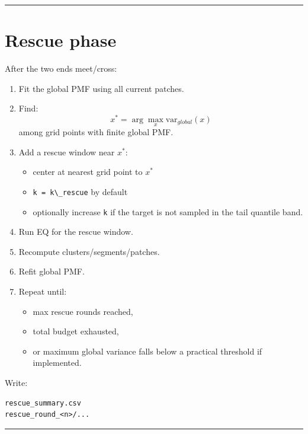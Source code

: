 \documentclass[
  10.5pt,
]{article}
\newcommand{\passthrough}[1]{#1}
\providecommand{\tightlist}{%
  \setlength{\itemsep}{0pt}\setlength{\parskip}{0pt}}
\begin{document}
\begin{center}\rule{0.5\linewidth}{0.5pt}\end{center}

\section{Rescue phase}\label{rescue-phase}

After the two ends meet/cross:

\begin{enumerate}
\def\labelenumi{\arabic{enumi}.}
\tightlist
\item
  Fit the global PMF using all current patches.
\item
  Find: \[
  x^* = \arg\max_x \mathrm{var}_{global}(x)
  \] among grid points with finite global PMF.
\item
  Add a rescue window near \(x^*\):

  \begin{itemize}
  \tightlist
  \item
    center at nearest grid point to \(x^*\)
  \item
    \passthrough{\lstinline!k = k\_rescue!} by default
  \item
    optionally increase \passthrough{\lstinline!k!} if the target is not
    sampled in the tail quantile band.
  \end{itemize}
\item
  Run EQ for the rescue window.
\item
  Recompute clusters/segments/patches.
\item
  Refit global PMF.
\item
  Repeat until:

  \begin{itemize}
  \tightlist
  \item
    max rescue rounds reached,
  \item
    total budget exhausted,
  \item
    or maximum global variance falls below a practical threshold if
    implemented.
  \end{itemize}
\end{enumerate}

Write:

\begin{lstlisting}
rescue_summary.csv
rescue_round_<n>/...
\end{lstlisting}

\begin{center}\rule{0.5\linewidth}{0.5pt}\end{center}
\end{document}
